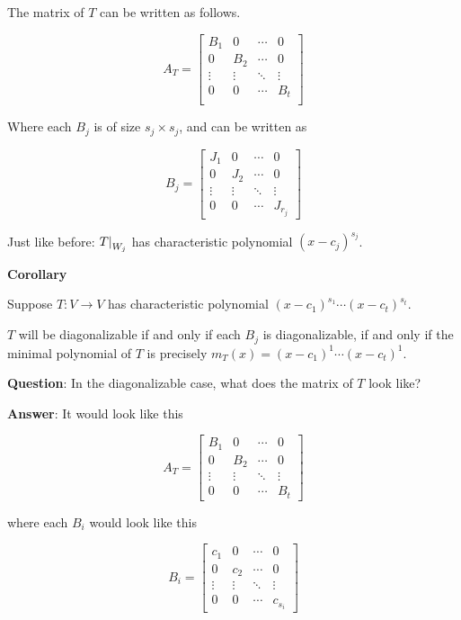 \documentclass[12pt]{article}
\begin{document}
  The matrix of $T$ can be written as follows.

  \[
    A_T = \begin{bmatrix}
      B_1 & 0 & \cdots & 0 \\
      0 & B_2 & \cdots & 0 \\
      \vdots & \vdots & \ddots & \vdots \\
      0 & 0 & \cdots & B_t \\
    \end{bmatrix}
  \]

  Where each $B_j$ is of size $s_j \times s_j$, and can be written as

  \[
    B_j = \begin{bmatrix}
      J_1 & 0 & \cdots & 0 \\
      0 & J_2 & \cdots & 0 \\
      \vdots & \vdots & \ddots & \vdots \\
      0 & 0 & \cdots & J_{r_j}
    \end{bmatrix}
  \]

  Just like before: $\restr{T}{W_j}$ has characteristic polynomial $(x -
  c_j)^{s_j}$.

  {\bf Corollary}

  Suppose $T: V \to V$ has characteristic polynomial $(x - c_1)^{s_1} \cdots (x
  - c_t)^{s_t}$.

  $T$ will be diagonalizable if and only if each $B_j$ is diagonalizable, if and
  only if the minimal polynomial of $T$ is precisely $m_T(x) = (x - c_1)^1
  \cdots (x - c_t)^1$.

  {\bf Question}: In the diagonalizable case, what does the matrix of $T$ look
  like?

  {\bf Answer}: It would look like this

  \[
    A_T = \begin{bmatrix}
      B_1 & 0 & \cdots & 0 \\
      0 & B_2 & \cdots & 0 \\
      \vdots & \vdots & \ddots & \vdots \\
      0 & 0 & \cdots & B_t
    \end{bmatrix}
  \]

  where each $B_i$ would look like this

  \[
    B_i = \begin{bmatrix}
      c_1 & 0 & \cdots & 0 \\
      0 & c_2 & \cdots & 0 \\
      \vdots & \vdots & \ddots & \vdots \\
      0 & 0 & \cdots & c_{s_i}
    \end{bmatrix}
  \]
\end{document}
